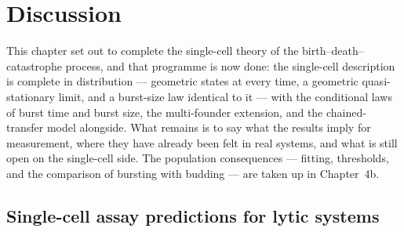 
\section{Discussion}
\label{sec:discussion}

This chapter set out to complete the single-cell theory of the
birth--death--catastrophe process, and that programme is now done: the
single-cell description is complete in distribution --- geometric states at
every time, a geometric quasi-stationary limit, and a burst-size law
identical to it --- with the conditional laws of burst time and burst size,
the multi-founder extension, and the chained-transfer model alongside. What
remains is to say what the results imply for measurement, where they have
already been felt in real systems, and what is still open on the
single-cell side. The population consequences --- fitting, thresholds, and
the comparison of bursting with budding --- are taken up in Chapter~4b.

\subsection{Single-cell assay predictions for lytic systems}
\label{sec:discussion-assay}

